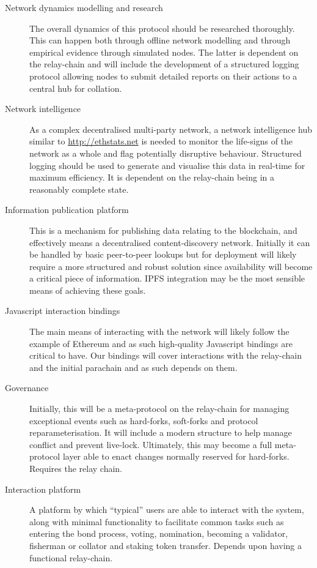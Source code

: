\documentclass[t,usepdftitle=false]{beamer}
\begin{document}
\begin{frame}
\begin{description}
\item[Network dynamics modelling and research] The overall dynamics of this protocol should be researched thoroughly. This can happen both through offline network modelling and through empirical evidence through simulated nodes. The latter is dependent on the relay-chain and will include the development of a structured logging protocol allowing nodes to submit detailed reports on their actions to a central hub for collation.

\item[Network intelligence] As a complex decentralised multi-party network, a network intelligence hub similar to \url{http://ethstats.net} is needed to monitor the life-signs of the network as a whole and flag potentially disruptive behaviour. Structured logging should be used to generate and visualise this data in real-time for maximum efficiency. It is dependent on the relay-chain being in a reasonably complete state.

\item[Information publication platform] This is a mechanism for publishing data relating to the blockchain, and effectively means a decentralised content-discovery network. Initially it can be handled by basic peer-to-peer lookups but for deployment will likely require a more structured and robust solution since availability will become a critical piece of information. IPFS integration may be the most sensible means of achieving these goals.

\item[Javascript interaction bindings] The main means of interacting with the network will likely follow the example of Ethereum and as such high-quality Javascript bindings are critical to have. Our bindings will cover interactions with the relay-chain and the initial parachain and as such depends on them.

\item[Governance] Initially, this will be a meta-protocol on the relay-chain for managing exceptional events such as hard-forks, soft-forks and protocol reparameterisation. It will include a modern structure to help manage conflict and prevent live-lock. Ultimately, this may become a full meta-protocol layer able to enact changes normally reserved for hard-forks. Requires the relay chain.

\item[Interaction platform] A platform by which ``typical'' users are able to interact with the system, along with minimal functionality to facilitate common tasks such as entering the bond process, voting, nomination, becoming a validator, fisherman or collator and staking token transfer. Depends upon having a functional relay-chain.


\end{description}
\end{frame}
\end{document}
